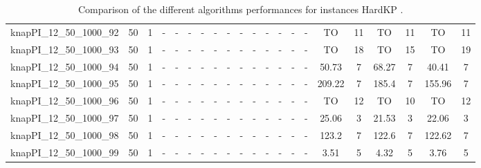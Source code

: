 \begin{sidewaystable}[!ht]
{\begin{tabular}{lcccccccccccccccccccc}
knapPI\_12\_50\_1000\_92 & 50 & 1 &  - &  - &  - &  - &  - &  - &  - &  - &  - &  - &  - &  - & TO & 11 & TO & 11 & TO & 11 \\
knapPI\_12\_50\_1000\_93 & 50 & 1 &  - &  - &  - &  - &  - &  - &  - &  - &  - &  - &  - &  - & TO & 18 & TO & 15 & TO & 19 \\
knapPI\_12\_50\_1000\_94 & 50 & 1 &  - &  - &  - &  - &  - &  - &  - &  - &  - &  - &  - &  - & 50.73 & 7 & 68.27 & 7 & 40.41 & 7 \\
knapPI\_12\_50\_1000\_95 & 50 & 1 &  - &  - &  - &  - &  - &  - &  - &  - &  - &  - &  - &  - & 209.22 & 7 & 185.4 & 7 & 155.96 & 7 \\
knapPI\_12\_50\_1000\_96 & 50 & 1 &  - &  - &  - &  - &  - &  - &  - &  - &  - &  - &  - &  - & TO & 12 & TO & 10 & TO & 12 \\
knapPI\_12\_50\_1000\_97 & 50 & 1 &  - &  - &  - &  - &  - &  - &  - &  - &  - &  - &  - &  - & 25.06 & 3 & 21.53 & 3 & 22.06 & 3 \\
knapPI\_12\_50\_1000\_98 & 50 & 1 &  - &  - &  - &  - &  - &  - &  - &  - &  - &  - &  - &  - & 123.2 & 7 & 122.6 & 7 & 122.62 & 7 \\
knapPI\_12\_50\_1000\_99 & 50 & 1 &  - &  - &  - &  - &  - &  - &  - &  - &  - &  - &  - &  - & 3.51 & 5 & 4.32 & 5 & 3.76 & 5 \\
\bottomrule
\end{tabular}
}%
\caption{Comparison of the different algorithms performances for instances HardKP .}
\label{tab:table_compare_HardKP }
\end{sidewaystable}
